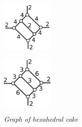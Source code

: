 \documentclass[suppldata, dvipdfmx]{interact}
\theoremstyle{plain}%
\theoremstyle{definition}
\theoremstyle{remark}
\theoremstyle{problemstyle}
\begin{document}
\begin{figure}[h!tbp]
\begin{minipage}[t]{0.6\textwidth}
\begin{minipage}[t]{0.19\textwidth}
   \centering
   \includegraphics[width=1in, keepaspectratio]{./img/HexahedraWithSphericalFaces/hexahedralCake/hexahedralCake_b.png}
   \subcaption{}
   \label{}
  \end{minipage}
 \hspace*{\fill}
  \begin{minipage}[t]{0.19\textwidth}
   \centering
   \includegraphics[width=1in, keepaspectratio]{./img/HexahedraWithSphericalFaces/hexahedralCake/hexahedralCake_c.png}
   \subcaption{}
   \label{}
  \end{minipage}
 \hspace*{\fill}
  \caption{\textit{Graph of hexahedral cake}}
  \label{}
 \end{minipage}
\end{figure}
\end{document}
